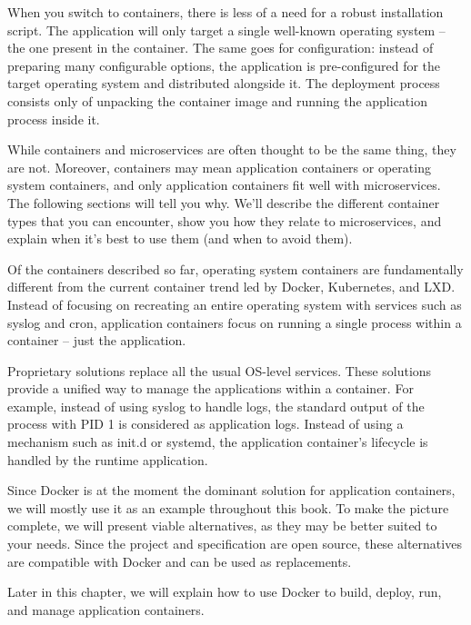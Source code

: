 When you switch to containers, there is less of a need for a robust installation script. The application will only target a single well-known operating system – the one present in the container. The same goes for configuration: instead of preparing many configurable options, the application is pre-configured for the target operating system and distributed alongside it. The deployment process consists only of unpacking the container image and running the application process inside it.

While containers and microservices are often thought to be the same thing, they are not. Moreover, containers may mean application containers or operating system containers, and only application containers fit well with microservices. The following sections will tell you why. We'll describe the different container types that you can encounter, show you how they relate to microservices, and explain when it's best to use them (and when to avoid them).


Of the containers described so far, operating system containers are fundamentally different from the current container trend led by Docker, Kubernetes, and LXD. Instead of focusing on recreating an entire operating system with services such as syslog and cron, application containers focus on running a single process within a container – just the application.

Proprietary solutions replace all the usual OS-level services. These solutions provide a unified way to manage the applications within a container. For example, instead of using syslog to handle logs, the standard output of the process with PID 1 is considered as application logs. Instead of using a mechanism such as init.d or systemd, the application container's lifecycle is handled by the runtime application.

Since Docker is at the moment the dominant solution for application containers, we will mostly use it as an example throughout this book. To make the picture complete, we will present viable alternatives, as they may be better suited to your needs. Since the project and specification are open source, these alternatives are compatible with Docker and can be used as replacements.

Later in this chapter, we will explain how to use Docker to build, deploy, run, and manage application containers.

